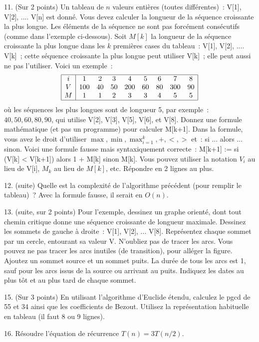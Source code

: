 \documentclass[11pt]{article}
\begin{document}
{11. (Sur 2 points)  Un tableau de $n$ valeurs entières (toutes différentes)~:  V[1], V[2], .... V[n] est donné.
Vous devez calculer la longueur de la séquence croissante la plus longue.
Les éléments de la séquence ne sont pas forcément consécutifs (comme dans l'exemple ci-dessous).
Soit $M[k]$ la longueur de la séquence croissante la plus longue 
dans les $k$ premières cases du tableau~: V[1], V[2], .... V[k]~; 
cette séquence croissante la plus longue
peut utiliser V[k]~; elle peut aussi ne pas l'utiliser. 
Voici un exemple~:
$$\begin{array}{|c|cccccccc|}
\hline
i & 1 & 2 & 3 & 4 & 5 & 6 & 7 & 8 \\
V & 100 & 40 & 50 & 200 & 60 & 80 & 300 & 90 \\
M & 1 & 1 & 2 & 3 & 3 & 4 & 5 & 5 \\
\hline
\end{array}
$$
où les séquences les plus longues sont de longueur 5, par exemple~:
$40, 50, 60, 80, 90$, qui utilise V[2], V[3], V[5], V[6], et V[8].
Donnez une formule mathématique (et pas un programme) pour calculer M[k+1]. 
Dans la formule, vous avez le droit d'utiliser $\max, \min, \max_{i=1}^k, +, <, >$ et~:
si ... alors ... sinon. Voici une formule fausse mais syntaxiquement correcte~:
M[k+1] := si (V[k] <  V[k+1]) alors 1 + M[k] sinon M[k]. 
Vous pouvez utiliser la notation $V_i$ au lieu de V[i], $M_k$ au lieu de $M[k]$, etc. 
Répondre en 2 lignes au plus. 
 
12.  (suite) Quelle est la complexité de l'algorithme précédent (pour remplir le tableau)~? Avec la formule fausse, il serait en $O(n)$.
 
13. (suite, sur 2 points) Pour l'exemple, dessinez un graphe orienté, dont tout chemin critique donne une séquence croissante de longueur maximale. 
Dessinez les sommets
de gauche à droite~: V[1], V[2], ... V[8].
Représentez chaque sommet par un cercle, entourant sa valeur V. 
N'oubliez pas de tracer les arcs. Vous pouvez ne pas tracer les arcs inutiles (de transition), pour alléger la figure.
Ajoutez un sommet source et un sommet puits.
La durée
de tous les arcs est 1, sauf pour les arcs issus de la source ou arrivant au puits. 
Indiquez les dates au plus tôt et au plus tard de chaque sommet. 

15. (Sur 3 points) En utilisant l'algorithme d'Euclide étendu, calculez le pgcd de 55 et 34 ainsi que les coefficients de Bezout.
Utilisez la représentation habituelle en tableau (il faut 8 ou 9 lignes).

16. Résoudre l'équation de récurrence $T(n)=3T(n/2)$.
}
\end{document}
